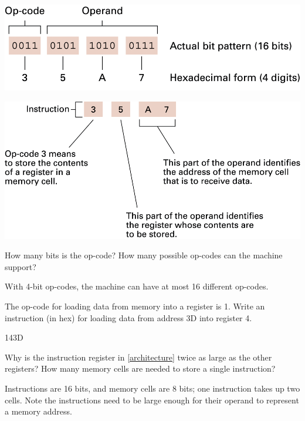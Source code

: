 

\begin{multicols}{2}
\includegraphics[width=\linewidth]{opcode1.png}

\columnbreak

\includegraphics[width=\linewidth]{opcode2.png}
\end{multicols}




\Q How many bits is the op-code? How many possible op-codes can the machine support?

\begin{answer}
With 4-bit op-codes, the machine can have at most 16 different op-codes.
\end{answer}


\Q The op-code for loading data from memory into a register is 1.
Write an instruction (in hex) for loading data from address 3D into register 4.

\begin{answer}
143D
\end{answer}


\Q Why is the instruction register in \ref{architecture} twice as large as the other registers?
How many memory cells are needed to store a single instruction?

\begin{answer}
Instructions are 16 bits, and memory cells are 8 bits; one instruction takes up two cells.
Note the instructions need to be large enough for their operand to represent a memory address.
\end{answer}
